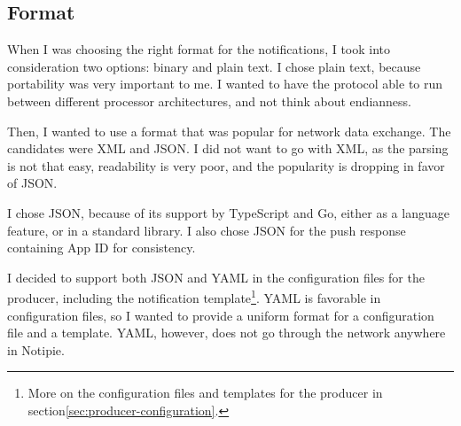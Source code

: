 \subsection{Format}\label{sec:protocol-format}

When I was choosing the right format
for the notifications,
I took into consideration two options:
binary and plain text.
I chose plain text,
because portability was very important to me.
I wanted to have the protocol able to run
between different processor architectures,
and not think about endianness.

Then, I wanted to use a format
that was popular for network data exchange.
The candidates were XML and JSON.
I did not want to go with XML,
as the parsing is not that easy,
readability is very poor,
and the popularity is dropping
in favor of JSON.

I chose JSON,
because of its support by TypeScript and Go,
either as a language feature,
or in a standard library.
I also chose JSON for the push response
containing App ID
for consistency.

I decided to support both JSON and YAML
in the configuration files for the producer,
including the notification template\footnote{
  More on the configuration files and templates
  for the producer
  in section\ref{sec:producer-configuration}.
}.
YAML is favorable in configuration files,
so I wanted to provide a uniform
format for a configuration file
and a template.
YAML, however,
does not go through the network
anywhere in Notipie.
